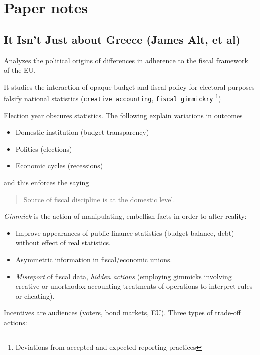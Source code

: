 \section{Paper notes}\label{paper-notes}

\subsection{It Isn't Just about Greece (James Alt, et
al)}\label{it-isnt-just-about-greece-james-alt-et-al}

Analyzes the political origins of differences in adherence to the fiscal
framework of the EU.

It studies the interaction of opaque budget and fiscal policy for
electoral purposes falsify national statistics
(\texttt{creative accounting}, \texttt{fiscal gimmickry} \footnote{Deviations
  from accepted and expected reporting practices})

Election year obscures statistics. The following explain variations in
outcomes

\begin{itemize}
\itemsep1pt\parskip0pt
\item
  Domestic institution (budget transparency)
\item
  Politics (elections)
\item
  Economic cycles (recessions)
\end{itemize}

and this enforces the saying

\begin{quote}
Source of fiscal discipline is at the domestic level.
\end{quote}

\emph{Gimmick} is the action of manipulating, embellish facts in order
to alter reality:

\begin{itemize}
\itemsep1pt\parskip0pt
\item
  Improve appearances of public finance statistics (budget balance,
  debt) without effect of real statistics.
\item
  Asymmetric information in fiscal/economic unions.
\item
  \emph{Misreport} of fiscal data, \emph{hidden actions} (employing
  gimmicks involving creative or unorthodox accounting treatments of
  operations to interpret rules or cheating).
\end{itemize}

Incentives are audiences (voters, bond markets, EU). Three types of
trade-off actions:

